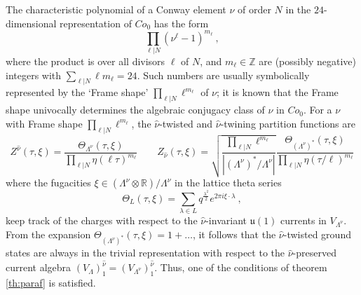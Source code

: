 \documentclass[11pt,reqno]{article}
\newcommand{\be}{\begin{equation}}
\newcommand{\ee}{\end{equation}}
\newcommand{\ZZ}{\mathbb{Z}}
\newcommand{\RR}{\mathbb{R}}
\newcommand{\alg}[1]{\mathfrak{#1}}
\begin{document}
The characteristic polynomial of a Conway element $\nu$ of order $N$ in the $24$-dimensional representation of $Co_0$ has the form
\be \prod_{\ell|N} (\nu^\ell -1)^{m_\ell}\ ,
\ee where the product is over all divisors $\ell$ of $N$, and  $m_\ell\in \ZZ$ are (possibly negative) integers with $\sum_{\ell|N} \ell m_\ell=24$.  Such numbers are usually symbolically represented by the `Frame shape' $\prod_{\ell|N} \ell^{m_\ell}$ of $\nu$; it is known that the Frame shape univocally determines the algebraic conjugacy class of $\nu$ in $Co_0$. For a $\nu$ with Frame shape $\prod_{\ell|N} \ell^{m_\ell}$, the $\hat\nu$-twisted and $\hat\nu$-twining partition functions are
\be\label{twistwinLeech} Z^{\hat\nu}(\tau,\xi)=\frac{\Theta_{\Lambda^\nu}(\tau,\xi)}{\prod_{\ell |N}\eta(\ell\tau)^{m_\ell}}\qquad Z_{\hat\nu}(\tau,\xi)=\sqrt{\frac{\prod_{\ell|N}\ell^{m_\ell}}{|(\Lambda^\nu)^*/\Lambda^\nu|}}\frac{\Theta_{(\Lambda^\nu)^*}(\tau,\xi)}{\prod_{\ell |N}\eta(\tau/\ell)^{m_\ell}}
\ee where the fugacities $\xi\in (\Lambda^\nu\otimes\RR)/\Lambda^\nu$ in the lattice theta series
\be \Theta_{L}(\tau,\xi)=\sum_{\lambda\in L}q^{\frac{\lambda^2}{2}}e^{2\pi i \xi\cdot\lambda}\ ,
\ee keep track of the charges with respect to the $\hat\nu$-invariant $\alg{u}(1)$ currents in $V_{\Lambda^\nu}$. From the expansion $\Theta_{(\Lambda^\nu)^*}(\tau,\xi)=1+\ldots$, it follows that the $\hat\nu$-twisted ground states are always in the trivial representation with respect to the $\hat \nu$-preserved current algebra $(V_\Lambda)^{\hat\nu}_1=(V_{\Lambda^\nu})^{\hat\nu}_1$. Thus, one of the conditions of theorem \ref{th:paraf} is satisfied.
\end{document}
